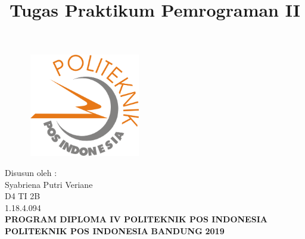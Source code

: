 \documentclass[a4paper, 12pt]{article}
\begin{document}
\title{\huge\textbf{Tugas Praktikum Pemrograman II}}
\date{}

\maketitle


\begin{figure}[!ht]
\begin{center}
\includegraphics[width = 5cm, height = 4.5cm]{gambar/logo.png}
\end{center}
\end{figure}

\begin{center}
\vspace{1cm}
Disusun oleh :\\
Syabriena Putri Veriane\\
D4 TI 2B\\
1.18.4.094\\
\vspace{1cm}
\textbf{PROGRAM DIPLOMA IV POLITEKNIK POS INDONESIA} \linebreak
\textbf{POLITEKNIK POS INDONESIA} \linebreak
\textbf{BANDUNG}\linebreak
\textbf{2019}

\end{center}

\thispagestyle{empty}



\end{document}

